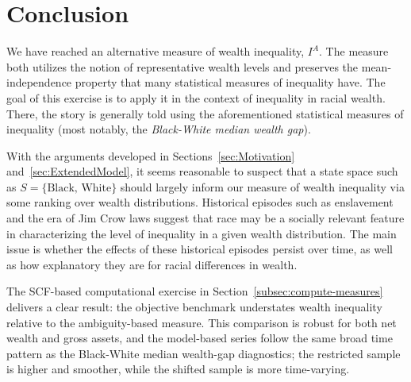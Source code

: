 \documentclass[../../../00-main.tex]{subfiles}
\begin{document}
\section{Conclusion}
\label{sec:chapter3-conclusion}

\par We have reached an alternative measure of wealth inequality, $I^{A}$. The measure both utilizes the notion of representative wealth levels and preserves the mean-independence property that many statistical measures of inequality have. The goal of this exercise is to apply it in the context of inequality in racial wealth. There, the story is generally told using the aforementioned statistical measures of inequality (most notably, the \textit{Black-White median wealth gap}).

\par With the arguments developed in Sections~\ref{sec:Motivation} and~\ref{sec:ExtendedModel}, it seems reasonable to suspect that a state space such as $S=\{\text{Black, White}\}$ should largely inform our measure of wealth inequality via some ranking over wealth distributions. Historical episodes such as enslavement and the era of Jim Crow laws suggest that race may be a socially relevant feature in characterizing the level of inequality in a given wealth distribution. The main issue is whether the effects of these historical episodes persist over time, as well as how explanatory they are for racial differences in wealth.

\par The SCF-based computational exercise in Section~\ref{subsec:compute-measures} delivers a clear result: the objective benchmark understates wealth inequality relative to the ambiguity-based measure. This comparison is robust for both net wealth and gross assets, and the model-based series follow the same broad time pattern as the Black-White median wealth-gap diagnostics; the restricted sample is higher and smoother, while the shifted sample is more time-varying.
\end{document}
